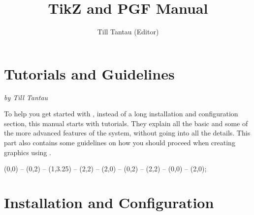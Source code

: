 %
%
%




\title{TikZ and PGF Manual}
\author{Till Tantau (Editor)}

\HTMLTitleAfterSection

\maketitle
\label{table-of-contents}

\tableofcontents




\part[tutorials-guidelines]{Tutorials and Guidelines}

{\Large \emph{by Till Tantau}}

\bigskip
\noindent To help you get started with \tikzname, instead of a long
installation and configuration section, this manual starts with tutorials. They
explain all the basic and some of the more advanced features of the system,
without going into all the details. This part also contains some guidelines on
how you should proceed when creating graphics using \tikzname.

\vskip3cm

\begin{codeexample}[graphic=white,width=0pt]
\tikz \draw[thick,rounded corners=8pt]
  (0,0) -- (0,2) -- (1,3.25) -- (2,2) -- (2,0) -- (0,2) -- (2,2) -- (0,0) -- (2,0);
\end{codeexample}









\part[install]{Installation and Configuration}

